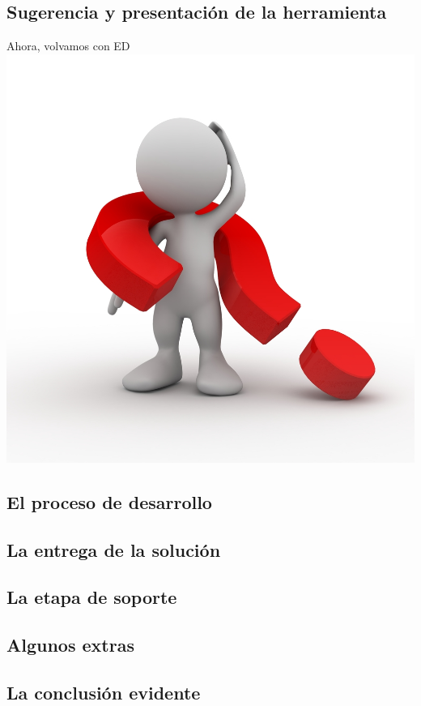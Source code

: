 \subsection{Sugerencia y presentación de la herramienta}
  

\begin{frame}{Ahora, volvamos con ED}
  \centering
  \includegraphics[scale=0.8]{img/hello_ed}
\end{frame}

\subsection{El proceso de desarrollo}
  
\subsection{La entrega de la solución}
  
\subsection{La etapa de soporte}
  
\subsection{Algunos extras}
  
\subsection{La conclusión evidente}
  
